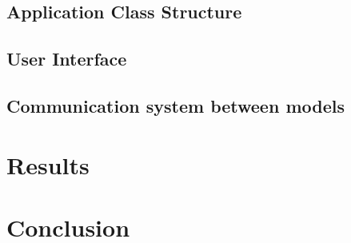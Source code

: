 \documentclass{article}
\begin{document}
\subsection{Application Class Structure}

\subsection{User Interface}
\subsection{Communication system between models}

\section{Results}

\section{Conclusion}

\newpage 
\end{document}
